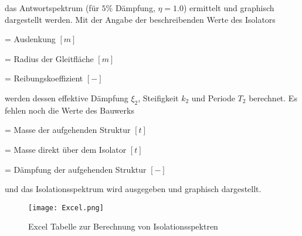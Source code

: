 \pagebreak

das Antwortspektrum (für $5 \%$ Dämpfung, $\eta = 1.0$) ermittelt und graphisch dargestellt werden.
Mit der Angabe der beschreibenden Werte des Isolators

    = Auslenkung $[m]$ \par
{}    = Radius der Gleitfläche $[m]$ \par
\makebox[1cm]{$\mu$}  = Reibungskoeffizient $[-]$ \par

werden dessen effektive Dämpfung $\xi_2$, Steifigkeit $k_2$ und Periode $T_2$ berechnet. Es fehlen noch die Werte des Bauwerks

  = Masse der aufgehenden Struktur $[t]$ \par
{}  = Masse direkt über dem Isolator $[t]$ \par
{} = Dämpfung der aufgehenden Struktur $[-]$ \par

und das Isolationsspektrum wird ausgegeben und graphisch dargestellt.

\begin{figure}[H]
    \centering
    \texttt{[image: Excel.png]}
    \caption{Excel Tabelle zur Berechnung von Isolationsspektren}
    \label{fig:excel}
\end{figure}


\pagebreak